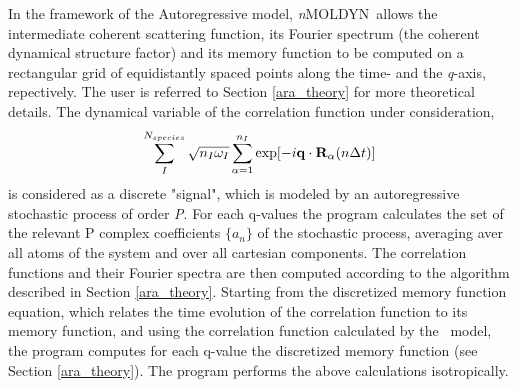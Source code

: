 \documentclass[a4paper,11pt]{report}
\newcommand{\qval}{\textit{q}}
\newcommand{\NMOLDYN}{\textit{n}MOLDYN}
\begin{document}
In the framework of the Autoregressive model, \NMOLDYN\ allows the intermediate coherent scattering function, its Fourier 
spectrum (the coherent dynamical structure factor) and its memory function to be computed on a rectangular grid of 
equidistantly spaced points along the time- and the \qval-axis, repectively. The user is referred to Section 
\ref{ara_theory} for more theoretical details. The dynamical variable of the correlation function under consideration, 
\begin{equation}
\label{eq:dcsfar_rho}
\sum^{N_{species}}_I \sqrt{n_I \omega_I} \sum^{n_I}_{\alpha=1} \exp[-i{\bf q}\cdot{\bf R}_\alpha(n\Delta t)]
\end{equation}
is considered as a discrete "signal", which is modeled by an autoregressive stochastic process of order \textit{P}. For each 
q-values the program calculates the set of the relevant P complex coefficients $\{a_n\}$ of the stochastic process, 
averaging aver all atoms of the system and over all cartesian components. The correlation functions and their Fourier 
spectra are then computed according to the algorithm described in Section \ref{ara_theory}.
Starting from the discretized memory function equation, which relates the time evolution of the correlation function to its 
memory function, and using the correlation function calculated by the \AR\ model, the program computes for each q-value the 
discretized memory function (see Section \ref{ara_theory}).
The program performs the above calculations isotropically.
\newpage
\end{document}

